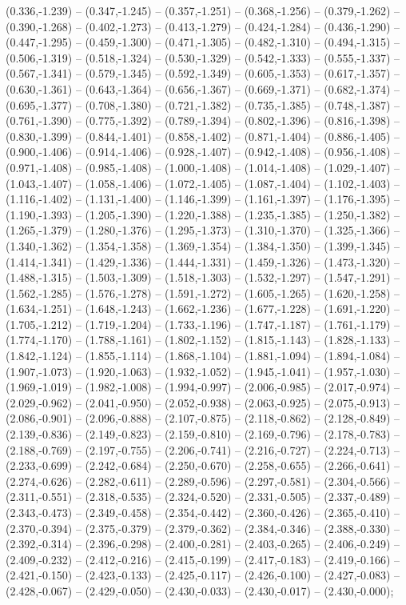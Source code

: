 (0.336,-1.239) -- (0.347,-1.245) -- (0.357,-1.251) -- (0.368,-1.256) -- (0.379,-1.262) -- (0.390,-1.268) -- (0.402,-1.273) -- (0.413,-1.279) -- (0.424,-1.284) -- (0.436,-1.290) -- (0.447,-1.295) -- (0.459,-1.300) -- (0.471,-1.305) -- (0.482,-1.310) -- (0.494,-1.315) -- (0.506,-1.319) -- (0.518,-1.324) -- (0.530,-1.329) -- (0.542,-1.333) -- (0.555,-1.337) -- (0.567,-1.341) -- (0.579,-1.345) -- (0.592,-1.349) -- (0.605,-1.353) -- (0.617,-1.357) -- (0.630,-1.361) -- (0.643,-1.364) -- (0.656,-1.367) -- (0.669,-1.371) -- (0.682,-1.374) -- (0.695,-1.377) -- (0.708,-1.380) -- (0.721,-1.382) -- (0.735,-1.385) -- (0.748,-1.387) -- (0.761,-1.390) -- (0.775,-1.392) -- (0.789,-1.394) -- (0.802,-1.396) -- (0.816,-1.398) -- (0.830,-1.399) -- (0.844,-1.401) -- (0.858,-1.402) -- (0.871,-1.404) -- (0.886,-1.405) -- (0.900,-1.406) -- (0.914,-1.406) -- (0.928,-1.407) -- (0.942,-1.408) -- (0.956,-1.408) -- (0.971,-1.408) -- (0.985,-1.408) -- (1.000,-1.408) -- (1.014,-1.408) -- (1.029,-1.407) -- (1.043,-1.407) -- (1.058,-1.406) -- (1.072,-1.405) -- (1.087,-1.404) -- (1.102,-1.403) -- (1.116,-1.402) -- (1.131,-1.400) -- (1.146,-1.399) -- (1.161,-1.397) -- (1.176,-1.395) -- (1.190,-1.393) -- (1.205,-1.390) -- (1.220,-1.388) -- (1.235,-1.385) -- (1.250,-1.382) -- (1.265,-1.379) -- (1.280,-1.376) -- (1.295,-1.373) -- (1.310,-1.370) -- (1.325,-1.366) -- (1.340,-1.362) -- (1.354,-1.358) -- (1.369,-1.354) -- (1.384,-1.350) -- (1.399,-1.345) -- (1.414,-1.341) -- (1.429,-1.336) -- (1.444,-1.331) -- (1.459,-1.326) -- (1.473,-1.320) -- (1.488,-1.315) -- (1.503,-1.309) -- (1.518,-1.303) -- (1.532,-1.297) -- (1.547,-1.291) -- (1.562,-1.285) -- (1.576,-1.278) -- (1.591,-1.272) -- (1.605,-1.265) -- (1.620,-1.258) -- (1.634,-1.251) -- (1.648,-1.243) -- (1.662,-1.236) -- (1.677,-1.228) -- (1.691,-1.220) -- (1.705,-1.212) -- (1.719,-1.204) -- (1.733,-1.196) -- (1.747,-1.187) -- (1.761,-1.179) -- (1.774,-1.170) -- (1.788,-1.161) -- (1.802,-1.152) -- (1.815,-1.143) -- (1.828,-1.133) -- (1.842,-1.124) -- (1.855,-1.114) -- (1.868,-1.104) -- (1.881,-1.094) -- (1.894,-1.084) -- (1.907,-1.073) -- (1.920,-1.063) -- (1.932,-1.052) -- (1.945,-1.041) -- (1.957,-1.030) -- (1.969,-1.019) -- (1.982,-1.008) -- (1.994,-0.997) -- (2.006,-0.985) -- (2.017,-0.974) -- (2.029,-0.962) -- (2.041,-0.950) -- (2.052,-0.938) -- (2.063,-0.925) -- (2.075,-0.913) -- (2.086,-0.901) -- (2.096,-0.888) -- (2.107,-0.875) -- (2.118,-0.862) -- (2.128,-0.849) -- (2.139,-0.836) -- (2.149,-0.823) -- (2.159,-0.810) -- (2.169,-0.796) -- (2.178,-0.783) -- (2.188,-0.769) -- (2.197,-0.755) -- (2.206,-0.741) -- (2.216,-0.727) -- (2.224,-0.713) -- (2.233,-0.699) -- (2.242,-0.684) -- (2.250,-0.670) -- (2.258,-0.655) -- (2.266,-0.641) -- (2.274,-0.626) -- (2.282,-0.611) -- (2.289,-0.596) -- (2.297,-0.581) -- (2.304,-0.566) -- (2.311,-0.551) -- (2.318,-0.535) -- (2.324,-0.520) -- (2.331,-0.505) -- (2.337,-0.489) -- (2.343,-0.473) -- (2.349,-0.458) -- (2.354,-0.442) -- (2.360,-0.426) -- (2.365,-0.410) -- (2.370,-0.394) -- (2.375,-0.379) -- (2.379,-0.362) -- (2.384,-0.346) -- (2.388,-0.330) -- (2.392,-0.314) -- (2.396,-0.298) -- (2.400,-0.281) -- (2.403,-0.265) -- (2.406,-0.249) -- (2.409,-0.232) -- (2.412,-0.216) -- (2.415,-0.199) -- (2.417,-0.183) -- (2.419,-0.166) -- (2.421,-0.150) -- (2.423,-0.133) -- (2.425,-0.117) -- (2.426,-0.100) -- (2.427,-0.083) -- (2.428,-0.067) -- (2.429,-0.050) -- (2.430,-0.033) -- (2.430,-0.017) -- (2.430,-0.000);
